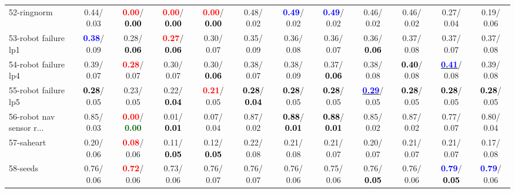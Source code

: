 \begin{table}[h]
\begin{center}
{\begin{tabular}{lc|c|c|c|c|c|c|c|c|c|c}
52-ringnorm &   0.44/  0.03 & \textcolor{red}{\textbf{  0.00}}/\textcolor{black}{\textbf{  0.00}} & \textcolor{red}{\textbf{  0.00}}/\textcolor{black}{\textbf{  0.00}} & \textcolor{red}{\textbf{  0.00}}/\textcolor{black}{\textbf{  0.00}} &   0.48/  0.02 & \textcolor{blue}{\textbf{  0.49}}/  0.02 & \textcolor{blue}{\textbf{  0.49}}/  0.02 &   0.46/  0.02 &   0.46/  0.02 &   0.27/  0.04 &   0.19/  0.06 \\
53-robot failure lp1 & \textcolor{blue}{\textbf{  0.38}}/  0.09 &   0.28/\textcolor{black}{\textbf{  0.06}} & \textcolor{red}{\textbf{  0.27}}/\textcolor{black}{\textbf{  0.06}} &   0.30/  0.07 &   0.35/  0.09 &   0.36/  0.08 &   0.36/  0.07 &   0.36/\textcolor{black}{\textbf{  0.06}} &   0.37/  0.08 &   0.37/  0.07 &   0.37/  0.08 \\ \hline
54-robot failure lp4 &   0.39/  0.07 & \textcolor{red}{\textbf{  0.28}}/  0.07 &   0.30/  0.07 &   0.30/\textcolor{black}{\textbf{  0.06}} &   0.38/  0.07 &   0.38/  0.09 &   0.37/\textcolor{black}{\textbf{  0.06}} &   0.38/  0.08 & \textcolor{black}{\textbf{  0.40}}/  0.08 & \underline{\textcolor{blue}{\textbf{  0.41}}}/  0.08 &   0.39/  0.08 \\
55-robot failure lp5 & \textcolor{black}{\textbf{  0.28}}/  0.05 &   0.23/  0.05 &   0.22/\textcolor{black}{\textbf{  0.04}} & \textcolor{red}{\textbf{  0.21}}/  0.05 & \textcolor{black}{\textbf{  0.28}}/\textcolor{black}{\textbf{  0.04}} & \textcolor{black}{\textbf{  0.28}}/  0.05 & \textcolor{black}{\textbf{  0.28}}/  0.05 & \underline{\textcolor{blue}{\textbf{  0.29}}}/  0.05 & \textcolor{black}{\textbf{  0.28}}/  0.05 & \textcolor{black}{\textbf{  0.28}}/  0.05 & \textcolor{black}{\textbf{  0.28}}/  0.05 \\
56-robot nav sensor r... &   0.85/  0.03 & \textcolor{red}{\textbf{  0.00}}/\textcolor{darkgreen}{\textbf{  0.00}} &   0.01/\textcolor{black}{\textbf{  0.01}} &   0.07/  0.04 &   0.87/  0.02 & \textcolor{black}{\textbf{  0.88}}/\textcolor{black}{\textbf{  0.01}} & \textcolor{black}{\textbf{  0.88}}/\textcolor{black}{\textbf{  0.01}} &   0.85/  0.02 &   0.87/  0.02 &   0.77/  0.07 &   0.80/  0.04 \\
57-saheart &   0.20/  0.06 & \textcolor{red}{\textbf{  0.08}}/  0.06 &   0.11/\textcolor{black}{\textbf{  0.05}} &   0.12/\textcolor{black}{\textbf{  0.05}} &   0.22/  0.08 &   0.21/  0.08 &   0.21/  0.07 &   0.20/  0.07 &   0.21/  0.07 &   0.21/  0.07 &   0.17/  0.08 \\
58-seeds &   0.76/  0.06 & \textcolor{red}{\textbf{  0.72}}/  0.06 &   0.73/  0.06 &   0.76/  0.07 &   0.76/  0.07 &   0.76/  0.06 &   0.75/  0.06 &   0.76/\textcolor{black}{\textbf{  0.05}} &   0.76/  0.06 & \textcolor{blue}{\textbf{  0.79}}/\textcolor{black}{\textbf{  0.05}} & \textcolor{blue}{\textbf{  0.79}}/  0.06 \\

\end{tabular}}
\end{center}
\end{table}
